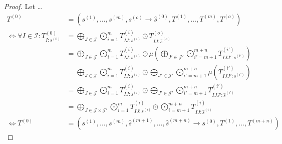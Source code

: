 \begin{proof}
    Let \dots
    \begin{align*}
        T^{(0)}                                              & = (s^{(1)},\dots,s^{(m)}, s^{(o)} \rightarrow \hat{s}^{(0)}, T^{(1)},\dots,T^{(m)}, T^{(o)})                                                                                                                       \\
        \iff \forall I \in \mathcal{I}: T^{(0)}_{I: s^{(0)}} & = \bigoplus\limits_{J \in \mathcal{J}} \bigodot\limits_{i = 1}^{m} T^{(i)}_{IJ:s^{(i)}} \odot T^{(o)}_{IJ:\hat{s}^{(o)}}                                                                                           \\
                                                             & = \bigoplus\limits_{J \in \mathcal{J}} \bigodot\limits_{i = 1}^{m} T^{(i)}_{IJ:s^{(i)}} \odot \mu\left(\bigoplus\limits_{J' \in \mathcal{J}'} \bigodot\limits_{i' = m + 1}^{m + n} T^{(i')}_{IJJ':s^{(i')}}\right) \\
                                                             & = \bigoplus\limits_{J \in \mathcal{J}} \bigodot\limits_{i = 1}^{m} T^{(i)}_{IJ:s^{(i)}} \odot \bigoplus\limits_{J' \in \mathcal{J}'} \bigodot\limits_{i' = m + 1}^{m + n} \mu\left(T^{(i')}_{IJJ':s^{(i')}}\right) \\
                                                             & = \bigoplus\limits_{J \in \mathcal{J}} \bigodot\limits_{i = 1}^{m} T^{(i)}_{IJ:s^{(i)}} \odot \bigoplus\limits_{J' \in \mathcal{J}'} \bigodot\limits_{i' = m + 1}^{m + n} T^{(i')}_{IJJ':\hat{s}^{(i')}}           \\
                                                             & = \bigoplus\limits_{J \in \mathcal{J} \times \mathcal{J}'} \bigodot\limits_{i = 1}^{m} T^{(i)}_{IJ:s^{(i)}} \odot \bigodot\limits_{i = m + 1}^{m + n} T^{(i)}_{IJ:\hat{s}^{(i)}}                                   \\
        \iff T^{(0)}                                         & = (s^{(1)},\dots,s^{(m)}, \hat{s}^{(m + 1)}, \dots, \hat{s}^{(m + n)} \rightarrow s^{(0)}, T^{(1)},\dots,T^{(m + n)})
    \end{align*}
\end{proof}

